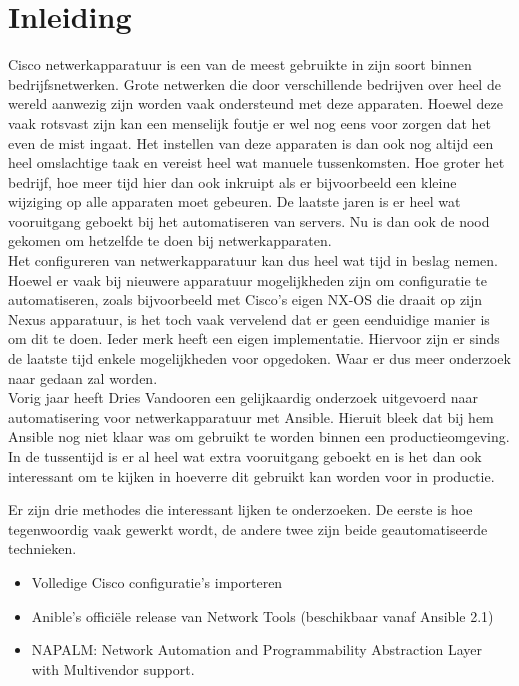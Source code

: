 
\chapter{Inleiding}
\label{ch:inleiding}
Cisco netwerkapparatuur is een van de meest gebruikte in zijn soort binnen bedrijfsnetwerken. Grote netwerken die door verschillende bedrijven over heel de wereld aanwezig zijn worden vaak ondersteund met deze apparaten. Hoewel deze vaak rotsvast zijn kan een menselijk foutje er wel nog eens voor zorgen dat het even de mist ingaat. Het instellen van deze apparaten is dan ook nog altijd een heel omslachtige taak en vereist heel wat manuele tussenkomsten. Hoe groter het bedrijf, hoe meer tijd hier dan ook inkruipt als er bijvoorbeeld een kleine wijziging op alle apparaten moet gebeuren. De laatste jaren is er heel wat vooruitgang geboekt bij het automatiseren van servers. Nu is dan ook de nood gekomen om hetzelfde te doen bij netwerkapparaten. 
\\

Het configureren van netwerkapparatuur kan dus heel wat tijd in beslag nemen. Hoewel er vaak bij nieuwere apparatuur mogelijkheden zijn om configuratie te automatiseren, zoals bijvoorbeeld met Cisco's eigen NX-OS die draait op zijn Nexus apparatuur, is het toch vaak vervelend dat er geen eenduidige manier is om dit te doen. \autocite{ciscoNxosPDF} Ieder merk heeft een eigen implementatie. Hiervoor zijn er sinds de laatste tijd enkele mogelijkheden voor opgedoken. Waar er dus meer onderzoek naar gedaan zal worden.\autocite{Vandooren2015}
\\

Vorig jaar heeft Dries Vandooren een gelijkaardig onderzoek uitgevoerd naar automatisering voor netwerkapparatuur met Ansible. Hieruit bleek dat bij hem Ansible nog niet klaar was om gebruikt te worden binnen een productieomgeving. In de tussentijd is er al heel wat extra vooruitgang geboekt en is het dan ook interessant om te kijken in hoeverre dit gebruikt kan worden voor in productie.

Er zijn drie methodes die interessant lijken te onderzoeken. De eerste is hoe tegenwoordig vaak gewerkt wordt, de andere twee zijn beide geautomatiseerde technieken.
\begin{itemize}
\item Volledige Cisco configuratie's importeren 
\item Anible's officiële release van Network Tools (beschikbaar vanaf Ansible 2.1)
\item NAPALM: Network Automation and Programmability Abstraction Layer with Multivendor support.
\\
\end{itemize}

